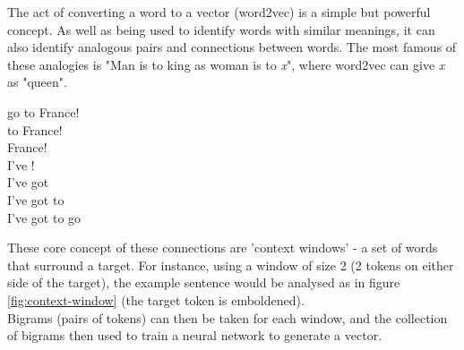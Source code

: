 The act of converting a word to a vector (word2vec) is a simple but powerful concept. As well as being used to identify words with similar meanings, it can also identify analogous pairs and connections between words. The most famous of these analogies is "Man is to king as woman is to \textit{x}", where word2vec can give \textit{x} as "queen". \cite{church2017}


\begin{minipage}{1.5in}

\end{minipage}

\begin{minipage}{0.4\textwidth}
\begin{center}
 go to France!\\ \vspace{1mm}
 to France!\\ \vspace{1mm}
 France!\\ \vspace{1mm}
I've !\\ \vspace{1mm}
I've got \\ \vspace{1mm}
I've got to \\ \vspace{1mm}
I've got to go \\ 
\end{center}
\label{fig:context-window}

\end{minipage}
\begin{minipage}{0.5\textwidth}
These core concept of these connections are 'context windows' - a set of words that surround a target. For instance, using a window of size 2 (2 tokens on either side of the target), the example sentence would be analysed as in figure \ref{fig:context-window} (the target token is emboldened).\\
Bigrams (pairs of tokens) can then be taken for each window, and the collection of bigrams then used to train a neural network to generate a vector.
\end{minipage}

\vspace{2mm}

